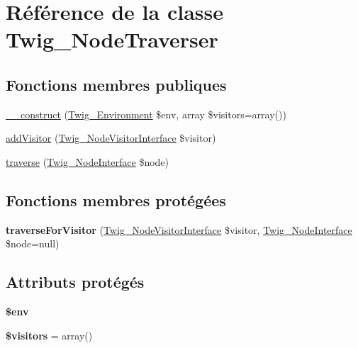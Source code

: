 \hypertarget{class_twig___node_traverser}{}\section{Référence de la classe Twig\+\_\+\+Node\+Traverser}
\label{class_twig___node_traverser}
\subsection*{Fonctions membres publiques}
\begin{DoxyCompactItemize}
\item 
\hyperlink{class_twig___node_traverser_abfc6550d22500c2fd6e9df3364b90503}{\+\_\+\+\_\+construct} (\hyperlink{class_twig___environment}{Twig\+\_\+\+Environment} \$env, array \$visitors=array())
\item 
\hyperlink{class_twig___node_traverser_a3a90d966767b0b5dfd3439b6240ad547}{add\+Visitor} (\hyperlink{interface_twig___node_visitor_interface}{Twig\+\_\+\+Node\+Visitor\+Interface} \$visitor)
\item 
\hyperlink{class_twig___node_traverser_a825bac4a4ce64a5a5213f9599196e7f4}{traverse} (\hyperlink{interface_twig___node_interface}{Twig\+\_\+\+Node\+Interface} \$node)
\end{DoxyCompactItemize}
\subsection*{Fonctions membres protégées}
\begin{DoxyCompactItemize}
\item 
{\bfseries traverse\+For\+Visitor} (\hyperlink{interface_twig___node_visitor_interface}{Twig\+\_\+\+Node\+Visitor\+Interface} \$visitor, \hyperlink{interface_twig___node_interface}{Twig\+\_\+\+Node\+Interface} \$node=null)\hypertarget{class_twig___node_traverser_acd52b9b58ba0f5d931ef7a074e87c7bb}{}\label{class_twig___node_traverser_acd52b9b58ba0f5d931ef7a074e87c7bb}

\end{DoxyCompactItemize}
\subsection*{Attributs protégés}
\begin{DoxyCompactItemize}
\item 
{\bfseries \$env}\hypertarget{class_twig___node_traverser_aa99ce9ae015e958eef5782267276fbb4}{}\label{class_twig___node_traverser_aa99ce9ae015e958eef5782267276fbb4}

\item 
{\bfseries \$visitors} = array()\hypertarget{class_twig___node_traverser_a63a73490fa0428629a602fd9042a95aa}{}\label{class_twig___node_traverser_a63a73490fa0428629a602fd9042a95aa}

\end{DoxyCompactItemize}


